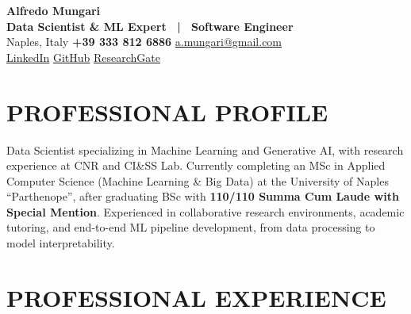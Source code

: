 \documentclass[10pt,a4paper]{article}
\begin{document}

\begin{center}
  {\fontsize{22pt}{26pt}\selectfont\textbf{\textcolor{primary}{Alfredo Mungari}}}\\[4pt]
  {\large\textbf{\textcolor{secondary}{Data Scientist \& ML Expert \ \textcolor{accent}{|} \ Software Engineer}}}\\[5pt]
  \small
  \textcolor{secondary}{Naples, Italy}
  \textcolor{accent}{\textbullet}
  \textbf{\textcolor{primary}{+39 333 812 6886}}
  \textcolor{accent}{\textbullet}
  \href{mailto:a.mungari@gmail.com}{\textcolor{accent}{a.mungari@gmail.com}}\\[2pt]
  \href{https://www.linkedin.com/in/alfredo-mungari-99ab9225a}{\textcolor{accent}{LinkedIn}}
  \textcolor{secondary}{\textbullet}
  \href{https://github.com/mungowz}{\textcolor{accent}{GitHub}}
  \textcolor{secondary}{\textbullet}
  \href{https://www.researchgate.net/profile/Alfredo-Mungari-2?ev=hdr_xprf}{\textcolor{accent}{ResearchGate}}
\end{center}

\vspace{2pt}

\section*{PROFESSIONAL PROFILE}
\noindent\small
Data Scientist specializing in Machine Learning and Generative AI, with research experience at CNR and CI\&SS Lab.
Currently completing an MSc in Applied Computer Science (Machine Learning \& Big Data) at the University of Naples ``Parthenope'',
after graduating BSc with \textbf{110/110 Summa Cum Laude with Special Mention}.
Experienced in collaborative research environments, academic tutoring, and end-to-end ML pipeline development, from data processing to model interpretability.
\normalsize

\section*{PROFESSIONAL EXPERIENCE}
\end{document}
